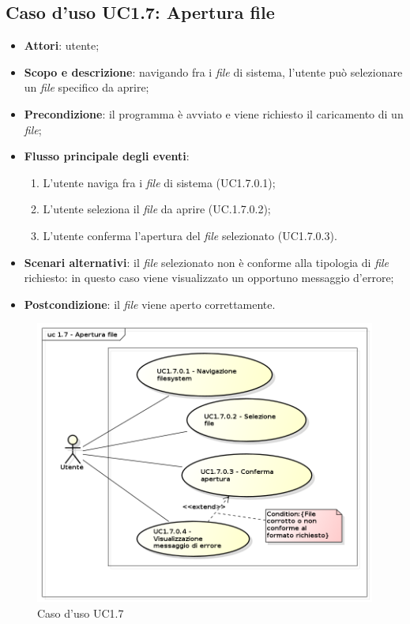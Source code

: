 \subsection{Caso d'uso UC1.7: Apertura file}
\label{sec:UC1.7}

\begin{itemize}
\item \textbf{Attori}: utente;
\item \textbf{Scopo e descrizione}: navigando fra i \textit{file} di sistema, l'utente può selezionare un \textit{file} specifico da aprire;
\item \textbf{Precondizione}: il programma è avviato e viene richiesto il caricamento di un \textit{file};
\item \textbf{Flusso principale degli eventi}:
\begin{enumerate}
\item L'utente naviga fra i \textit{file} di sistema (UC1.7.0.1);
\item L'utente seleziona il \textit{file} da aprire (UC.1.7.0.2);
\item L'utente conferma l'apertura del \textit{file} selezionato (UC1.7.0.3).
\end{enumerate}
\item \textbf{Scenari alternativi}: il \textit{file} selezionato non è conforme alla tipologia di \textit{file} richiesto: in questo caso viene visualizzato un opportuno messaggio d'errore;
\item \textbf{Postcondizione}: il \textit{file} viene aperto correttamente.
\end{itemize}
\begin{figure}[htbp]
\centering
\includegraphics[scale=0.5]{immagini/uc1_7_apertura_file.png}
\captionsetup{labelfont=bf}
\caption{Caso d'uso UC1.7}
\end{figure}
\newpage

